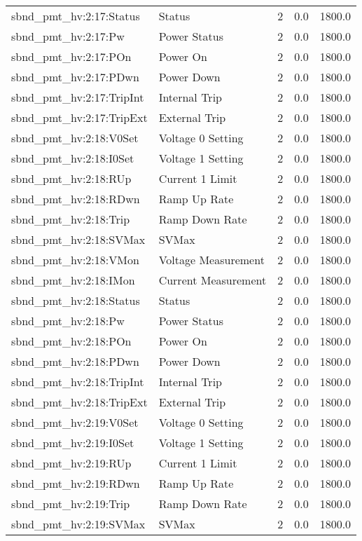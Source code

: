 \begin{center}
\begin{longtable}{l | l l l l }
sbnd\_pmt\_hv:2:17:Status & Status & 2 & 0.0 & 1800.0\\ 
sbnd\_pmt\_hv:2:17:Pw & Power Status & 2 & 0.0 & 1800.0\\ 
sbnd\_pmt\_hv:2:17:POn & Power On & 2 & 0.0 & 1800.0\\ 
sbnd\_pmt\_hv:2:17:PDwn & Power Down & 2 & 0.0 & 1800.0\\ 
sbnd\_pmt\_hv:2:17:TripInt & Internal Trip & 2 & 0.0 & 1800.0\\ 
sbnd\_pmt\_hv:2:17:TripExt & External Trip & 2 & 0.0 & 1800.0\\ 
sbnd\_pmt\_hv:2:18:V0Set & Voltage 0 Setting & 2 & 0.0 & 1800.0\\ 
sbnd\_pmt\_hv:2:18:I0Set & Voltage 1 Setting & 2 & 0.0 & 1800.0\\ 
sbnd\_pmt\_hv:2:18:RUp & Current 1 Limit & 2 & 0.0 & 1800.0\\ 
sbnd\_pmt\_hv:2:18:RDwn & Ramp Up Rate & 2 & 0.0 & 1800.0\\ 
sbnd\_pmt\_hv:2:18:Trip & Ramp Down Rate & 2 & 0.0 & 1800.0\\ 
sbnd\_pmt\_hv:2:18:SVMax & SVMax & 2 & 0.0 & 1800.0\\ 
sbnd\_pmt\_hv:2:18:VMon & Voltage Measurement & 2 & 0.0 & 1800.0\\ 
sbnd\_pmt\_hv:2:18:IMon & Current Measurement & 2 & 0.0 & 1800.0\\ 
sbnd\_pmt\_hv:2:18:Status & Status & 2 & 0.0 & 1800.0\\ 
sbnd\_pmt\_hv:2:18:Pw & Power Status & 2 & 0.0 & 1800.0\\ 
sbnd\_pmt\_hv:2:18:POn & Power On & 2 & 0.0 & 1800.0\\ 
sbnd\_pmt\_hv:2:18:PDwn & Power Down & 2 & 0.0 & 1800.0\\ 
sbnd\_pmt\_hv:2:18:TripInt & Internal Trip & 2 & 0.0 & 1800.0\\ 
sbnd\_pmt\_hv:2:18:TripExt & External Trip & 2 & 0.0 & 1800.0\\ 
sbnd\_pmt\_hv:2:19:V0Set & Voltage 0 Setting & 2 & 0.0 & 1800.0\\ 
sbnd\_pmt\_hv:2:19:I0Set & Voltage 1 Setting & 2 & 0.0 & 1800.0\\ 
sbnd\_pmt\_hv:2:19:RUp & Current 1 Limit & 2 & 0.0 & 1800.0\\ 
sbnd\_pmt\_hv:2:19:RDwn & Ramp Up Rate & 2 & 0.0 & 1800.0\\ 
sbnd\_pmt\_hv:2:19:Trip & Ramp Down Rate & 2 & 0.0 & 1800.0\\ 
sbnd\_pmt\_hv:2:19:SVMax & SVMax & 2 & 0.0 & 1800.0\\ 

\end{longtable}
\end{center}
